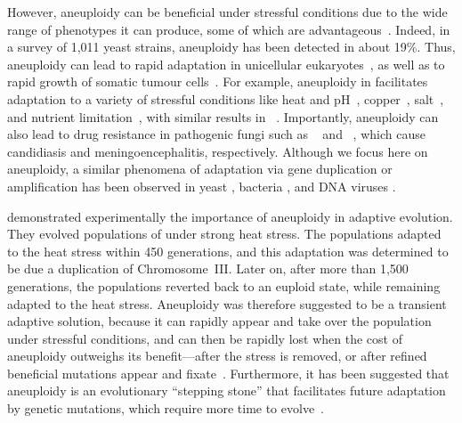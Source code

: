 \documentclass[12pt]{extarticle}
\begin{document}
However, aneuploidy can be beneficial under stressful conditions due to the wide range of phenotypes it can produce, some of which are advantageous~\citep{Pavelka2010, Yang2021}.
Indeed, in a survey of 1,011 yeast strains, aneuploidy has been detected in about 19\%\citep{Peter2018}.
Thus, aneuploidy can lead to rapid adaptation in unicellular eukaryotes~\citep{Gerstein2015,Torres2010, Hong2014, Rancati2008}, as well as to rapid growth of somatic tumour cells~\citep{Schvartzman2010, Sheltzer2017}.
For example, aneuploidy in \yeast facilitates adaptation to a variety of stressful conditions like heat and pH~\citep{Yona2012}, copper~\citep{Covo2014, Gerstein2015}, salt~\citep{Dhar2011, Robinson2023}, and nutrient limitation~\citep{Dunham2002, Gresham2008, Avecilla2022}, with similar results in \calbicans~\citep{Yang2021}.
Importantly, aneuploidy can also lead to drug resistance in pathogenic fungi such as \calbicans~\citep{Selmecki2008, Selmecki2010, Gerstein2020} and \cneoformans~\citep{Sionov2010}, which cause candidiasis and meningoencephalitis, respectively.
Although we focus here on aneuploidy, a similar phenomena of adaptation via gene duplication or amplification has been observed in yeast \citep{Lauer2018}, bacteria \citep{Sonti1989}, and DNA viruses \citep{Elde2012}.

\citet{Yona2012} demonstrated experimentally the importance of aneuploidy in adaptive evolution. They evolved populations of \yeast under strong heat stress.
The populations adapted to the heat stress within 450 generations, and this adaptation was determined to be due a duplication of Chromosome~III.
Later on, after more than 1,500 generations, the populations reverted back to an euploid state, while remaining adapted to the heat stress. 
Aneuploidy was therefore suggested to be a transient adaptive solution, because it can rapidly appear and take over the population under stressful conditions, and can then be rapidly lost when the cost of aneuploidy outweighs its benefit---after the stress is removed, or after refined beneficial mutations appear and fixate~\citep{Yona2012}.
Furthermore, it has been suggested that aneuploidy is an evolutionary ``stepping stone'' that facilitates future adaptation by genetic mutations, which require more time to evolve~\citep{Yona2012,Yona2015}.
\end{document}
